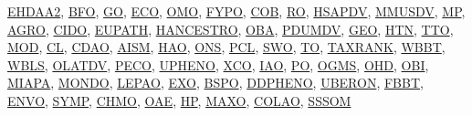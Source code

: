 \documentclass[10pt,a4paper,sans]{moderncv} %
\newcommand{\wikidata}[2]{\href{https://bioregistry.io/wikidata:#1?provider=scholia}{{#2}}}
\begin{document}
    \vspace{0.3cm}

        \wikidata{Q114667913}{EHDAA2},        \wikidata{Q4866972}{BFO},        \wikidata{Q135085}{GO},        \wikidata{Q28445410}{ECO},        \wikidata{Q113012675}{OMO},        \wikidata{Q55118393}{FYPO},        \wikidata{Q113006456}{COB},        \wikidata{Q28729320}{RO},        \wikidata{Q81661653}{HSAPDV},        \wikidata{Q81661698}{MMUSDV},        \wikidata{Q81661707}{MP},        \wikidata{Q81661533}{AGRO},        \wikidata{Q110998476}{CIDO},        \wikidata{Q81661607}{EUPATH},        \wikidata{Q81661647}{HANCESTRO},        \wikidata{Q81661730}{OBA},        \wikidata{Q81661775}{PDUMDV},        \wikidata{Q81661641}{GEO},        \wikidata{Q81661655}{HTN},        \wikidata{Q81661821}{TTO},        \wikidata{Q81661700}{MOD},        \wikidata{Q55118285}{CL},        \wikidata{Q55118328}{CDAO},        \wikidata{Q112972813}{AISM},        \wikidata{Q81661648}{HAO},        \wikidata{Q113014431}{ONS},        \wikidata{Q113014435}{PCL},        \wikidata{Q113014439}{SWO},        \wikidata{Q81661818}{TO},        \wikidata{Q81661813}{TAXRANK},        \wikidata{Q81661834}{WBBT},        \wikidata{Q81661837}{WBLS},        \wikidata{Q81661748}{OLATDV},        \wikidata{Q81661777}{PECO},        \wikidata{Q81661827}{UPHENO},        \wikidata{Q81661839}{XCO},        \wikidata{Q55118415}{IAO},        \wikidata{Q7201529}{PO},        \wikidata{Q55118512}{OGMS},        \wikidata{Q55118561}{OHD},        \wikidata{Q7095051}{OBI},        \wikidata{Q81661690}{MIAPA},        \wikidata{Q27468140}{MONDO},        \wikidata{Q113012667}{LEPAO},        \wikidata{Q113012658}{EXO},        \wikidata{Q81661546}{BSPO},        \wikidata{Q81661585}{DDPHENO},        \wikidata{Q7876491}{UBERON},        \wikidata{Q81661620}{FBBT},        \wikidata{Q31110555}{ENVO},        \wikidata{Q81661810}{SYMP},        \wikidata{Q55118301}{CHMO},        \wikidata{Q81661725}{OAE},        \wikidata{Q17027854}{HP},        \wikidata{Q113012668}{MAXO},        \wikidata{Q113009128}{COLAO},        \wikidata{Q108394480}{SSSOM}
\end{document}
